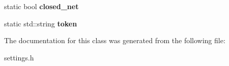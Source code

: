 \begin{DoxyCompactItemize}
\item 
static bool {\bfseries closed\+\_\+net}\hypertarget{classEmojidex_1_1Service_1_1Settings_a4794a14aa2dda9d5e238c4b4c289e77c}{}\label{classEmojidex_1_1Service_1_1Settings_a4794a14aa2dda9d5e238c4b4c289e77c}

\item 
static std\+::string {\bfseries token}\hypertarget{classEmojidex_1_1Service_1_1Settings_a1aa303c664a4b238dd72c92e9660f3c4}{}\label{classEmojidex_1_1Service_1_1Settings_a1aa303c664a4b238dd72c92e9660f3c4}

\end{DoxyCompactItemize}


The documentation for this class was generated from the following file\+:\begin{DoxyCompactItemize}
\item 
settings.\+h\end{DoxyCompactItemize}
